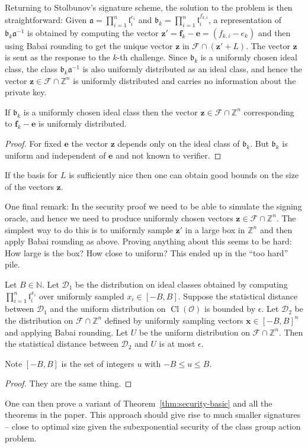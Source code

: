 \documentclass{llncs}
\newcommand{\D}{\mathcal{D}}
\newcommand{\FF}{\mathcal{F}}
\newcommand{\N}{\mathbb{N}}
\newcommand{\OO}{\mathcal{O}}
\newcommand{\Z}{\mathbb{Z}}
\DeclareMathOperator{\Cl}{Cl}
\renewcommand{\a}{\mathfrak{a}}
\renewcommand{\b}{\mathfrak{b}}
\renewcommand{\l}{\mathfrak{l}}
\newcommand{\e}{\mathbf{e}}
\newcommand{\f}{\mathbf{f}}
\newcommand{\x}{\mathbf{x}}
\newcommand{\z}{\mathbf{z}}
\begin{document}
Returning to Stolbunov's signature scheme, the solution to the problem is then straightforward:
Given $\a = \prod_{i=1}^n \l_i^{e_i}$ and $\b_k = \prod_{i=1}^n \l_i^{f_{k,i}}$,
a representation of $\b_k \a^{-1}$ is obtained by computing the vector $\z' = \f_k - \e = (f_{k,i} - e_k)$
and then using Babai rounding to get the unique vector $\z$ in $\FF \cap (\z' + L )$.
The vector $\z$ is sent as the response to the $k$-th challenge.
Since $\b_k$ is a uniformly chosen ideal class, the class $\b_k \a^{-1}$ is also uniformly distributed as an ideal class, and hence the vector $\z \in \FF \cap \Z^n$ is uniformly distributed and carries no information about the private key.

\begin{lemma}
If $\b_k$ is a uniformly chosen ideal class then the vector 
$\z \in \FF \cap \Z^n$ corresponding to $\f_k - \e$ is uniformly distributed.
\end{lemma}

\begin{proof}
For fixed $\e$ the vector $\z$ depends only on the ideal class of $\b_k$.
But $\b_k$ is uniform and independent of $\e$ and not known to verifier.
\end{proof}



If the basis for $L$ is sufficiently nice then one can obtain good bounds on the size of the vectors $\z$.

One final remark: In the security proof we need to be able to simulate the signing oracle, and hence we need to produce uniformly chosen vectors $\z \in \FF \cap \Z^n$.
The simplest way to do this is to uniformly sample $\z'$ in a large box in $\Z^n$ and then apply Babai rounding as above.
Proving anything about this seems to be hard: How large is the box? How close to uniform?
This ended up in the ``too hard'' pile.


\begin{lemma} \label{lem:sim1}
Let $B \in \N$. Let $\D_1$ be the distribution on ideal classes obtained by computing $\prod_{i=1}^n \l_i^{x_i}$ over uniformly sampled $x_i \in [-B,B]$.
Suppose the statistical distance between $\D_1$ and the uniform distribution on $\Cl(\OO)$ is bounded by $\epsilon$.
Let $\D_2$ be the distribution on $\FF \cap \Z^n$ defined by uniformly sampling vectors $\x \in [-B,B]^n$ and applying Babai rounding.
Let $U$ be the uniform distribution on $\FF \cap \Z^n$.
Then the statistical distance between $\D_2$ and $U$ is at most $\epsilon$.
\end{lemma}

Note $[-B,B]$ is the set of integers $u$ with $-B \le u \le B$.


\begin{proof}
They are the same thing.
\end{proof}


One can then prove a variant of Theorem~\ref{thm:security-basic} and all the theorems in the paper. This approach should give rise to much smaller signatures -- close to optimal size given the subexponential security of the class group action problem.
\end{document}
